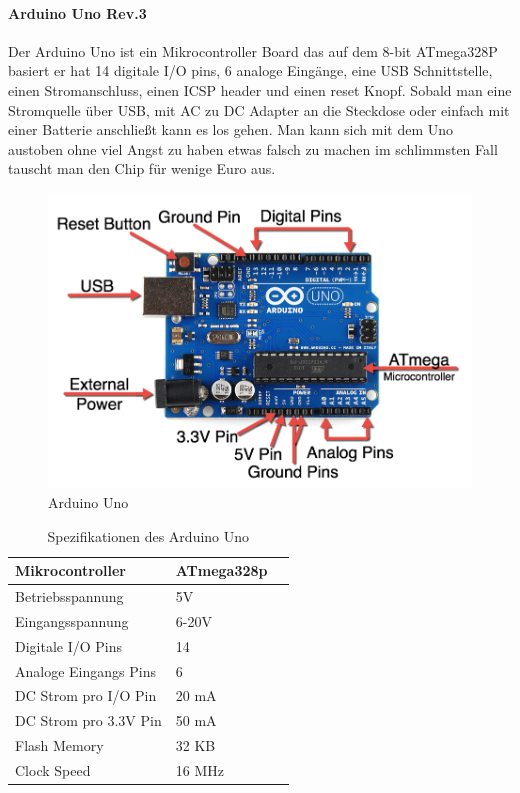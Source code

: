 \documentclass[12pt]{article}
\begin{document}
\paragraph{Arduino Uno Rev.3} Der Arduino Uno ist ein Mikrocontroller Board das auf dem 8-bit ATmega328P basiert er hat 14 digitale I/O pins, 6 analoge Eingänge, eine USB Schnittstelle, einen Stromanschluss, einen ICSP header und einen reset Knopf. Sobald man eine Stromquelle über USB, mit AC zu DC Adapter an die Steckdose  oder einfach mit einer Batterie anschließt kann es los gehen. Man kann sich mit dem Uno austoben ohne viel Angst zu haben etwas falsch zu machen im schlimmsten Fall tauscht man den Chip für wenige Euro aus.

\begin{figure}[thb]
\includegraphics[width=1\textwidth]{images/ArduinoParts.png}
\caption{Arduino Uno \cite{arduino-front}}
\end{figure}

\begin{table}[ht]
\caption{Spezifikationen des Arduino Uno \label{tab:table_label}}
\begin{tabularx}{\columnwidth}{XXl}
  Mikrocontroller&ATmega328p\\
  \hline
  Betriebsspannung&5V\\
  \hline
  Eingangsspannung&6-20V\\
  \hline
  Digitale I/O Pins&14\\
  \hline
  Analoge Eingangs Pins&6\\
  \hline
  DC Strom pro I/O Pin&20 mA\\
  \hline
  DC Strom pro 3.3V Pin&50 mA\\
  \hline
  Flash Memory&32 KB\\
  \hline
  Clock Speed&16 MHz\\
\end{tabularx}
\end{table}
\end{document}
